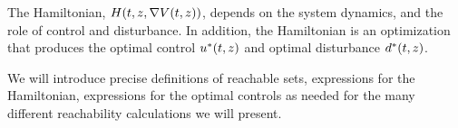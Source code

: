 The Hamiltonian, $H(t, z, \nabla V(t,z))$, depends on the system dynamics, and the role of control and disturbance. In addition, the Hamiltonian is an optimization that produces the optimal control $u^*(t, z)$ and optimal disturbance $d^*(t, z)$. 

We will introduce precise definitions of reachable sets, expressions for the Hamiltonian, expressions for the optimal controls as needed for the many different reachability calculations we will present. %
%
%
%
%
%
%
